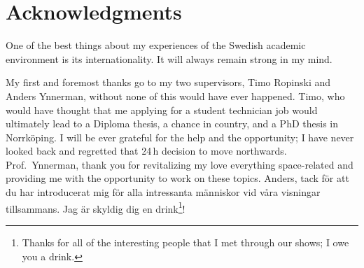 \chapter*{Acknowledgments}
\novocalize

One of the best things about my experiences of the Swedish academic environment is its internationality.  It will always remain strong in my mind.

My first and foremost thanks go to my two supervisors, Timo Ropinski and Anders Ynnerman, without none of this would have ever happened.  Timo, who would have thought that me applying for a student technician job would ultimately lead to a Diploma thesis, a chance in country, and a PhD thesis in Norrk\"oping.  I will be ever grateful for the help and the opportunity; I have never looked back and regretted that 24\,h decision to move northwards.  Prof.~Ynnerman, thank you for revitalizing my love everything space-related and providing me with the opportunity to work on these topics.  Anders, tack f\"or att du har introducerat mig f\"or alla intressanta m\"anniskor vid v\aa ra visningar tillsammans.  Jag \"ar skyldig dig en drink\footnote{Thanks for all of the interesting people that I met through our shows; I owe you a drink.}!

